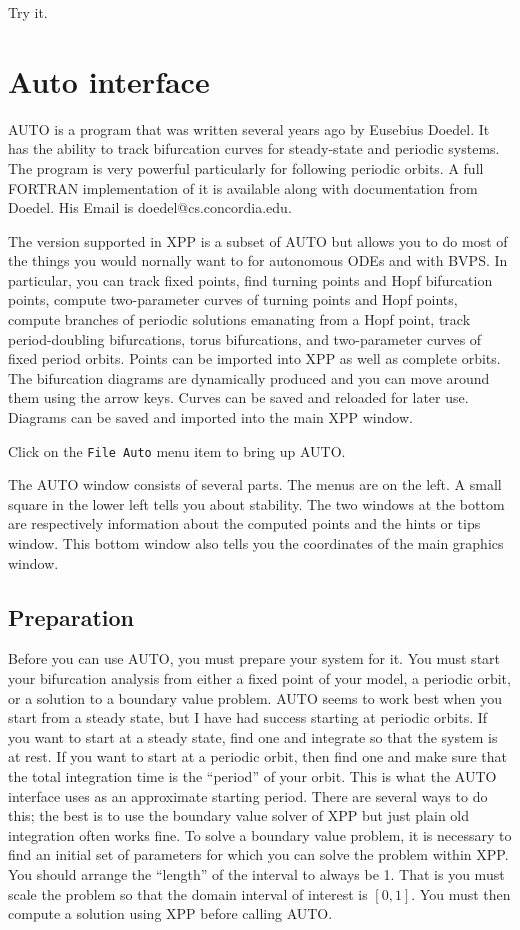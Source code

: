 \documentclass{article}
\newcommand{\tc}[1]{\addcontentsline{toc}{subsection}{#1}}
\begin{document}
Try it.

\section{Auto interface}

AUTO is a program that was written several years ago by Eusebius
Doedel.  It has the ability to track bifurcation curves for
steady-state and periodic systems.  The program is very powerful
particularly for following periodic orbits.  A full FORTRAN
implementation of it is available along with documentation from
Doedel.  His Email is doedel@cs.concordia.edu.  

The version supported in XPP is a subset of AUTO but allows you to do
most of the things you would nornally want to for autonomous ODEs and with 
BVPS.  In
particular, you can track fixed points, find turning points and Hopf
bifurcation points, compute two-parameter curves of turning points and
Hopf points, compute branches of periodic solutions emanating from a
Hopf point, track period-doubling bifurcations, torus bifurcations,
and two-parameter curves of fixed period orbits.  Points can be
imported into XPP as well as complete orbits.  The bifurcation
diagrams are dynamically produced and you can move around them using
the arrow keys.  Curves can be saved and reloaded for later use.
Diagrams can be saved and imported into the main XPP window. 

Click on the {\tt File Auto} menu item to bring up AUTO.

\tc{The AUTO Window}  The AUTO window consists of several parts.  The
menus are on the left. A small square in the lower left tells you
about stability.  The two windows at the bottom are respectively
information about the computed points and the hints or tips window.
This bottom window also tells you the coordinates of the main graphics
window.

\subsection{Preparation}

Before you can use AUTO, you must prepare your system for it.  You must
start your bifurcation analysis from either a  fixed point of your
model, a periodic orbit, or a solution to a boundary value problem.
  AUTO seems to work best when you start
from a steady state, but I have had success starting at periodic
orbits.  If you want to start at a steady state, find one and
integrate so that the system is at rest.  If you want to start at a
periodic orbit, then find one and make sure that the total integration
time is the ``period'' of your orbit.  This is what the AUTO interface
uses as an approximate starting period.  There are several ways to do
this; the best is to use the boundary value solver of XPP but just
plain old integration often works fine. To solve a boundary value
problem, it is necessary to find an initial set of parameters for
which you can solve the problem within XPP.  You should arrange the
``length'' of the interval to always be 1.  That is you must scale the
problem so that the domain interval of interest is $[0,1].$ You must
then compute a solution using XPP before calling AUTO.
 
\end{document}
